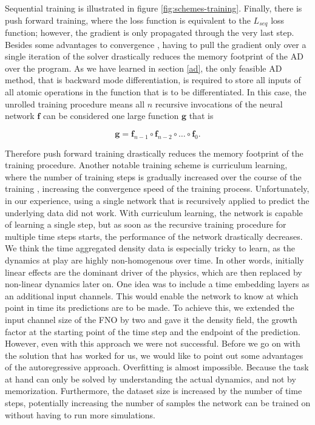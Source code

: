 \documentclass{article}
\begin{document}
Sequential training is illustrated in figure \ref{fig:schemes-training}. Finally, there is push forward training, where the loss function is equivalent to the $L_{seq}$ loss function; however, the gradient is only propagated through the very last step. Besides some advantages to convergence \citep{brandstetter2022message}, having to pull the gradient only over a single iteration of the solver drastically reduces the memory footprint of the AD over the program. As we have learned in section \ref{ad}, the only feasible AD method, that is backward mode differentiation, is required to store all inputs of all atomic operations in the function that is to be differentiated. In this case, the unrolled training procedure means all $n$ recursive invocations of the neural network $\mathbf{f}$ can be considered one large function $\mathbf{g}$ that is 

\begin{equation}
    \mathbf{g} = \mathbf{f}_{n-1} \circ \mathbf{f}_{n-2} \circ \dots \circ \mathbf{f}_0.
\end{equation}

Therefore push forward training drastically reduces the memory footprint of the training procedure. Another notable training scheme is curriculum learning, where the number of training steps is gradually increased over the course of the training \citep{krishnapriyan2021characterizing}, increasing the convergence speed of the training process. Unfortunately, in our experience, using a single network that is recursively applied to predict the underlying data did not work. With curriculum learning, the network is capable of learning a single step, but as soon as the recursive training procedure for multiple time steps starts, the performance of the network drastically decreases. We think the time aggregated density data is especially tricky to learn, as the dynamics at play are highly non-homogenous over time. In other words, initially linear effects are the dominant driver of the physics, which are then replaced by non-linear dynamics later on. One idea was to include a time embedding layers as an additional input channels. This would enable the network to know at which point in time its predictions are to be made. To achieve this, we extended the input channel size of the FNO by two and gave it the density field, the growth factor at the starting point of the time step and the endpoint of the prediction. However, even with this approach we were not successful. Before we go on with the solution that has worked for us, we would like to point out some advantages of the autoregressive approach. Overfitting is almost impossible. Because the task at hand can only be solved by understanding the actual dynamics, and not by memorization. Furthermore, the dataset size is increased by the number of time steps, potentially increasing the number of samples the network can be trained on without having to run more simulations. 
\end{document}
